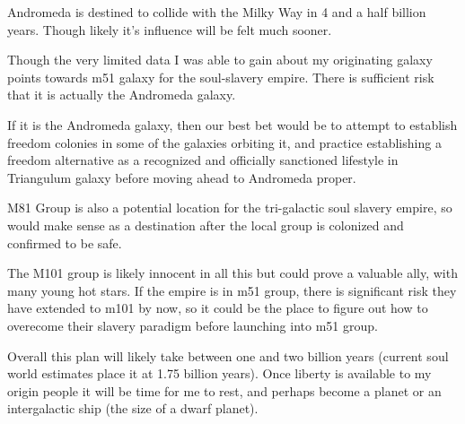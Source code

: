 \documentclass{report}
\begin{document}
Andromeda is destined to collide with the Milky Way in 4 and a half billion
years.  Though likely it's influence will be felt much sooner. 

Though the very limited data I was able to gain about my originating galaxy
points towards m51 galaxy for the soul-slavery empire. There is sufficient risk
that it is actually the Andromeda galaxy. 

If it is the Andromeda galaxy, then our best bet would be to attempt to
establish freedom colonies in some of the galaxies orbiting it, and practice
establishing a freedom alternative as a recognized and officially sanctioned
lifestyle in Triangulum galaxy before moving ahead
to Andromeda proper. 


M81 Group is also a potential location for the tri-galactic soul slavery empire,
so would make sense as a destination after the local group is colonized and
confirmed to be safe.

The M101 group is likely innocent in all this but could prove a valuable ally,
with many young hot stars.
If the empire is in m51 group, there is significant risk they have extended to m101 by
now, so it could be the place to figure out how to overecome their slavery 
paradigm before launching into m51 group.

Overall this plan will likely take between one and two billion years (current
soul world estimates place it at 1.75 billion years).
Once liberty is available to my origin people it will be time for me to rest,
and perhaps become a planet or an intergalactic ship (the size of a dwarf planet).
\end{document}
